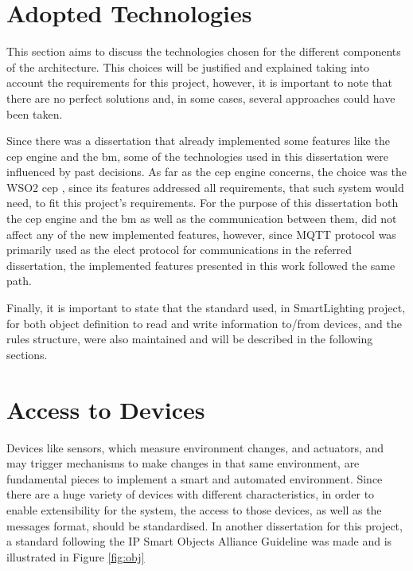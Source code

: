 \section{Adopted  Technologies}
\label{implementation:technologies}

This section aims to discuss the technologies chosen for the different components of the architecture. This choices will be justified and explained taking into account the requirements for this project, however, it is important to note that there are no perfect solutions and, in some cases, several approaches could have been taken. 

Since there was a dissertation\cite{helder} that already implemented some features like the \ac{cep} engine and the \ac{bm}, some of the technologies used in this dissertation were influenced by past decisions. As far as the \ac{cep} engine concerns, the choice was the WSO2 \ac{cep} \cite{wso2}, since its features addressed all requirements, that such system would need, to fit this project's requirements. For the purpose of this dissertation both the \ac{cep} engine and the \ac{bm} as well as the communication between them, did not affect any of the new implemented features, however, since MQTT protocol was primarily used as the elect protocol for communications in the referred dissertation, the implemented features presented in this work followed the same path.

Finally, it is important to state that the standard used, in SmartLighting project, for both object definition to read and write information to/from devices, and the rules structure, were also maintained and will be described in the following sections. 

\section{Access to Devices}
\label{implementation:devices}

Devices like sensors, which measure environment changes, and actuators, and may trigger mechanisms to make changes in that same environment, are fundamental pieces to implement a smart and automated environment. Since there are a huge variety of devices with different characteristics, in order to enable extensibility for the system, the access to those devices, as well as the messages format, should be standardised. In another dissertation for this project, a standard following the IP Smart Objects Alliance Guideline\cite{IPSOAlliance2014} was made and is illustrated in Figure \ref{fig:obj}

